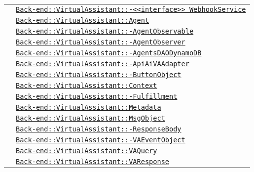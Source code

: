 \begin{longtable}{|>{\centering}m{3cm}|m{10cm}<{\centering}|}
& \hyperref[Back-end::VirtualAssistant::<<interface>> WebhookService]{\texttt{Back-end::VirtualAssistant::-\linebreak <<interface>> WebhookService}}\\
& \hyperref[Back-end::VirtualAssistant::Agent]{\texttt{Back-end::VirtualAssistant::Agent}}\\
& \hyperref[Back-end::VirtualAssistant::AgentObservable]{\texttt{Back-end::VirtualAssistant::-\linebreak AgentObservable}}\\
& \hyperref[Back-end::VirtualAssistant::AgentObserver]{\texttt{Back-end::VirtualAssistant::-\linebreak AgentObserver}}\\
& \hyperref[Back-end::VirtualAssistant::AgentsDAODynamoDB]{\texttt{Back-end::VirtualAssistant::-\linebreak AgentsDAODynamoDB}}\\
& \hyperref[Back-end::VirtualAssistant::ApiAiVAAdapter]{\texttt{Back-end::VirtualAssistant::-\linebreak ApiAiVAAdapter}}\\
& \hyperref[Back-end::VirtualAssistant::ButtonObject]{\texttt{Back-end::VirtualAssistant::-\linebreak ButtonObject}}\\
& \hyperref[Back-end::VirtualAssistant::Context]{\texttt{Back-end::VirtualAssistant::Context}}\\
& \hyperref[Back-end::VirtualAssistant::Fulfillment]{\texttt{Back-end::VirtualAssistant::-\linebreak Fulfillment}}\\
& \hyperref[Back-end::VirtualAssistant::Metadata]{\texttt{Back-end::VirtualAssistant::Metadata}}\\
& \hyperref[Back-end::VirtualAssistant::MsgObject]{\texttt{Back-end::VirtualAssistant::MsgObject}}\\
& \hyperref[Back-end::VirtualAssistant::ResponseBody]{\texttt{Back-end::VirtualAssistant::-\linebreak ResponseBody}}\\
& \hyperref[Back-end::VirtualAssistant::VAEventObject]{\texttt{Back-end::VirtualAssistant::-\linebreak VAEventObject}}\\
& \hyperref[Back-end::VirtualAssistant::VAQuery]{\texttt{Back-end::VirtualAssistant::VAQuery}}\\
& \hyperref[Back-end::VirtualAssistant::VAResponse]{\texttt{Back-end::VirtualAssistant::VAResponse}}\\

\end{longtable}

